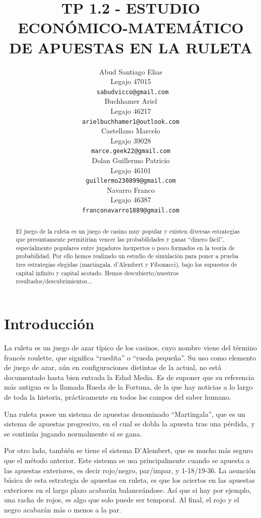 \documentclass{article}
\title{TP 1.2 - ESTUDIO ECONÓMICO-MATEMÁTICO DE APUESTAS EN LA RULETA}
\author{
    Abud Santiago Elias \\
    Legajo 47015 \\
    \texttt{ sabudvicco@gmail.com} \\
    \And
    Buchhamer Ariel \\
    Legajo 46217\\
    \texttt{arielbuchhamer1@outlook.com} \\
    \And
    Castellano Marcelo \\
    Legajo 39028 \\
    \texttt{marce.geek22@gmail.com} \\
    \And
    Dolan Guillermo Patricio \\
    Legajo 46101\\
    \texttt{guillermo230899@gmail.com} \\
    \And
    Navarro Franco \\
    Legajo 46387 \\
    \texttt{franconavarro1889@gmail.com} \\
}
\begin{document}
  \maketitle
  \begin{abstract}
    El juego de la ruleta es un juego de casino muy popular y existen diversas estrategias que presuntamente permitirían vencer las probabilidades y ganar ``dinero fácil'', especialmente populares entre jugadores inexpertos o poco formados en la teoría de probabilidad. Por ello hemos realizado un estudio de simulación para poner a prueba tres estrategias elegidas (martingala, d'Alembert y Fibonacci), bajo los supuestos de capital infinito y capital acotado. Hemos descubierto/nuestros resultados/descubrimientos... %
  \end{abstract}






    \section{Introducción}
    La ruleta es un juego de azar típico de los casinos, cuyo nombre viene del término francés roulette,
    que significa ``ruedita'' o ``rueda pequeña''. Su uso como elemento de juego de azar, aún
    en configuraciones distintas de la actual, no está documentado hasta bien entrada la Edad Media.
    Es de suponer que su referencia más antigua es la llamada Rueda de la Fortuna, de la que hay
    noticias a lo largo de toda la historia, prácticamente en todos los campos del saber humano.

    Una ruleta posee un sistema de apuestas denominado ``Martingala'', que es un sistema de apuestas progresivo,
    en el cual se dobla la apuesta tras una pérdida, y se continúa jugando normalmente si se gana.

    Por otro lado, también se tiene el sistema D'Alembert, que es mucho más seguro que el método anterior.
    Este sistema se usa principalmente cuando se apuesta a las apuestas exteriores,
    es decir rojo/negro, par/impar, y 1-18/19-36. La asunción básica de esta estrategia de apuestas en ruleta,
    es que los aciertos en las apuestas exteriores en el largo plazo acabarán balanceándose.
    Así que si hay por ejemplo, una racha de rojos, es algo que solo puede ser temporal.
    Al final, el rojo y el negro acabarán más o menos a la par.
\end{document}
